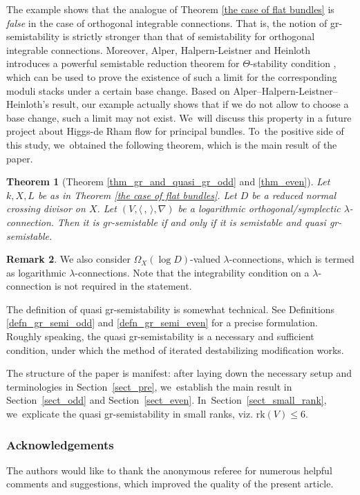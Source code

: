 \documentclass[11pt]{article}
\numberwithin{equation}{section}
\newcommand{\lconnection}{$\lambda$\nobreakdash-con\-nec\-tion\xspace}
\newcommand{\lconnections}{$\lambda$\nobreakdash-con\-nec\-tions\xspace}
\newcommand{\grsemistable}{gr\nobreakdash-semi\-stable\xspace}
\newcommand{\rk}{\mathrm{rk}}
\theoremstyle{plain}
\newtheorem{thm}{Theorem}[section]
\theoremstyle{definition}
\newtheorem{rem}[thm]{Remark}
\begin{document}
The example shows that the analogue of Theorem \ref{the case of flat bundles} is \emph{false} in the case of orthogonal integrable connections. That is, the notion of gr-semistability is strictly stronger than that of semistability for orthogonal integrable connections. Moreover, Alper, Halpern-Leistner and Heinloth introduces a powerful semistable reduction theorem for $\Theta$-stability condition \cite[Th.\,6.5]{AHLH23}, which can be used to prove the existence of such a limit for the corresponding moduli stacks under a certain base change. Based on Alper--Halpern-Leistner--Heinloth's result, our example actually shows that if we do not allow to choose a base change, such a limit may not exist. We~will discuss this property in a future project about Higgs-de Rham flow for principal bundles. To~the positive side of this study, we~obtained the following theorem, which is the main result of the paper.
\begin{thm}[Theorem \ref{thm_gr_and_quasi_gr_odd} and \ref{thm_even}]
Let $k,X,L$ be as in Theorem \ref{the case of flat bundles}. Let $D$ be a reduced normal crossing divisor on $X$. Let $(V,\langle \,, \, \rangle,\nabla)$ be a logarithmic orthogonal/symplectic \lconnection. Then it is \grsemistable if and only if it is semistable and quasi \grsemistable.
\end{thm}
\begin{rem}
We also consider $\Omega_X(\log D)$-valued \lconnections, which is termed as logarithmic \lconnections. Note that the integrability condition on a \lconnection is not required in the statement.
\end{rem}

The definition of quasi gr-semistability is somewhat technical. See Definitions \ref{defn_gr_semi_odd} and \ref{defn_gr_semi_even} for a precise formulation. Roughly speaking, the quasi gr-semistability is a necessary and sufficient condition, under which the method of iterated destabilizing modification works.

The structure of the paper is manifest: after laying down the necessary setup and terminologies in Section~\ref{sect_pre}, we~establish the main result in Section~\ref{sect_odd} and Section~\ref{sect_even}. In~Section~\ref{sect_small_rank}, we~explicate the quasi gr-semistability in small ranks, viz. $\rk(V)\leq 6$.

\subsubsection*{Acknowledgements}
The authors would like to thank the anonymous referee for numerous helpful comments and suggestions, which improved the quality of the present article.
\end{document}
